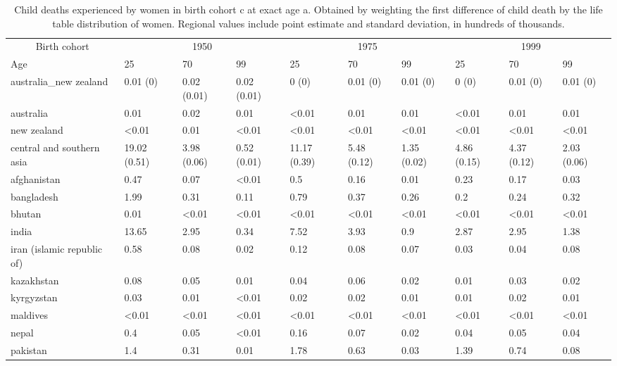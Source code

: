 \begin{table}[!h]

\caption{\label{tab:S8}Child deaths experienced by women in birth cohort c at exact age a. Obtained by weighting the first difference of child death by the life table distribution of women. Regional values include point estimate and standard deviation, in hundreds of thousands.}
\centering
\begin{tabular}[t]{llllllllll}
\toprule
\multicolumn{1}{c}{Birth cohort} & \multicolumn{3}{c}{1950} & \multicolumn{3}{c}{1975} & \multicolumn{3}{c}{1999} \\
\cmidrule(l{3pt}r{3pt}){1-1} \cmidrule(l{3pt}r{3pt}){2-4} \cmidrule(l{3pt}r{3pt}){5-7} \cmidrule(l{3pt}r{3pt}){8-10}
Age & 25 & 70 & 99 & 25 & 70 & 99 & 25 & 70 & 99\\
\midrule
australia\_new zealand & 0.01 (0) & 0.02 (0.01) & 0.02 (0.01) & 0 (0) & 0.01 (0) & 0.01 (0) & 0 (0) & 0.01 (0) & 0.01 (0)\\
australia & 0.01 & 0.02 & 0.01 & <0.01 & 0.01 & 0.01 & <0.01 & 0.01 & 0.01\\
new zealand & <0.01 & 0.01 & <0.01 & <0.01 & <0.01 & <0.01 & <0.01 & <0.01 & <0.01\\
central and southern asia & 19.02 (0.51) & 3.98 (0.06) & 0.52 (0.01) & 11.17 (0.39) & 5.48 (0.12) & 1.35 (0.02) & 4.86 (0.15) & 4.37 (0.12) & 2.03 (0.06)\\
afghanistan & 0.47 & 0.07 & <0.01 & 0.5 & 0.16 & 0.01 & 0.23 & 0.17 & 0.03\\
\addlinespace
bangladesh & 1.99 & 0.31 & 0.11 & 0.79 & 0.37 & 0.26 & 0.2 & 0.24 & 0.32\\
bhutan & 0.01 & <0.01 & <0.01 & <0.01 & <0.01 & <0.01 & <0.01 & <0.01 & <0.01\\
india & 13.65 & 2.95 & 0.34 & 7.52 & 3.93 & 0.9 & 2.87 & 2.95 & 1.38\\
iran (islamic republic of) & 0.58 & 0.08 & 0.02 & 0.12 & 0.08 & 0.07 & 0.03 & 0.04 & 0.08\\
kazakhstan & 0.08 & 0.05 & 0.01 & 0.04 & 0.06 & 0.02 & 0.01 & 0.03 & 0.02\\
\addlinespace
kyrgyzstan & 0.03 & 0.01 & <0.01 & 0.02 & 0.02 & 0.01 & 0.01 & 0.02 & 0.01\\
maldives & <0.01 & <0.01 & <0.01 & <0.01 & <0.01 & <0.01 & <0.01 & <0.01 & <0.01\\
nepal & 0.4 & 0.05 & <0.01 & 0.16 & 0.07 & 0.02 & 0.04 & 0.05 & 0.04\\
pakistan & 1.4 & 0.31 & 0.01 & 1.78 & 0.63 & 0.03 & 1.39 & 0.74 & 0.08\\

\end{tabular}
\end{table}
